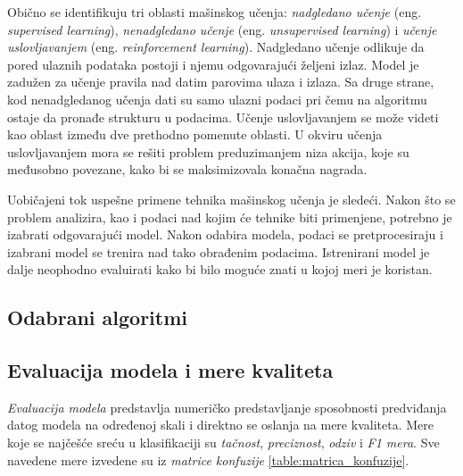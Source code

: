 \documentclass[a4paper]{article}
\theoremstyle{definition}
\begin{document}
{\par Obično se identifikuju tri oblasti mašinskog učenja: \textit{nadgledano učenje} (eng. \emph{supervised learning}), \textit{nenadgledano učenje} (eng. \emph{unsupervised learning}) i \textit{učenje uslovljavanjem} (eng. \emph{reinforcement learning}). Nadgledano učenje odlikuje da pored ulaznih podataka postoji i njemu odgovarajući željeni izlaz. Model je zadužen za učenje pravila nad datim parovima ulaza i izlaza. Sa druge strane, kod nenadgledanog učenja dati su samo ulazni podaci pri čemu na algoritmu ostaje da pronađe strukturu u podacima. 
Učenje uslovljavanjem se može videti kao oblast između dve pret\-hod\-no pomenute oblasti. U okviru učenja uslovljavanjem mora se rešiti problem preduzimanjem niza akcija, koje su međusobno povezane, kako bi se maksimizovala konačna nagrada.

\par Uobičajeni tok uspešne primene tehnika mašinskog učenja je sledeći. Nakon što se problem analizira, kao i podaci nad kojim će tehnike biti primenjene, potrebno je izabrati odgovarajući model. Nakon odabira modela, podaci se pretprocesiraju i izabrani model se trenira nad tako obrađenim podacima. Istrenirani model je dalje neophodno evaluirati kako bi bilo moguće znati u kojoj meri je koristan.

\subsection{Odabrani algoritmi}



\subsection{Evaluacija modela i mere kvaliteta}


\par \textit{Evaluacija modela} predstavlja numeričko predstavljanje sposobnosti predviđanja datog modela na određenoj skali i direktno se oslanja na mere kvaliteta. Mere koje se najčešće sreću u klasifikaciji su \textit{tačnost}, \textit{preciznost}, \textit{odziv} i \textit{F1 mera}. Sve navedene mere izvedene su iz \textit{matrice konfuzije} \ref{table:matrica_konfuzije}.

}
\end{document}
